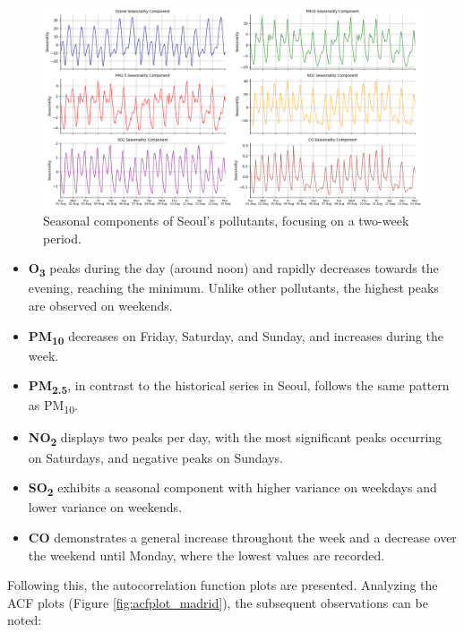 \begin{figure}[h]
    \centering
    \includegraphics[width=1\linewidth]{images/madrid_seasonality.png}
    \caption{Seasonal components of Seoul's pollutants, focusing on a two-week period.}
    \label{fig:madrid_seasonality}
\end{figure}

\begin{itemize}[noitemsep]
    \item \textbf{O\textsubscript{3}} peaks during the day (around noon) and rapidly decreases towards the evening, reaching the minimum. Unlike other pollutants, the highest peaks are observed on weekends.
    \item \textbf{PM\textsubscript{10}} decreases on Friday, Saturday, and Sunday, and increases during the week.
    \item \textbf{PM\textsubscript{2.5}}, in contrast to the historical series in Seoul, follows the same pattern as PM\textsubscript{10}.
    \item \textbf{NO\textsubscript{2}} displays two peaks per day, with the most significant peaks occurring on Saturdays, and negative peaks on Sundays.
    \item \textbf{SO\textsubscript{2}} exhibits a seasonal component with higher variance on weekdays and lower variance on weekends.
    \item \textbf{CO} demonstrates a general increase throughout the week and a decrease over the weekend until Monday, where the lowest values are recorded.
\end{itemize}

Following this, the autocorrelation function plots are presented. Analyzing the ACF plots (Figure \ref{fig:acfplot_madrid}), the subsequent observations can be noted:

